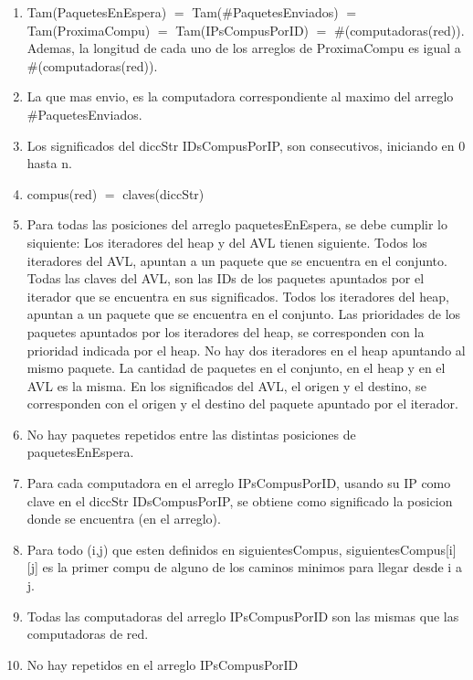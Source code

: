 \begin{Representacion}
    \begin{enumerate} 
      \item Tam(PaquetesEnEspera) $=$ Tam($\#$PaquetesEnviados) $=$ Tam(ProximaCompu) $=$ Tam(IPsCompusPorID) $=$ $\#$(computadoras(red)). Ademas, la longitud de cada uno de los arreglos de ProximaCompu es igual a \#(computadoras(red)).
      \item La que mas envio, es la computadora correspondiente al maximo del arreglo \#PaquetesEnviados.
      \item Los significados del diccStr IDsCompusPorIP, son consecutivos, iniciando en 0 hasta n.
      \item compus(red) $=$ claves(diccStr)
      \item Para todas las posiciones del arreglo paquetesEnEspera, se debe cumplir lo siquiente: 
              Los iteradores del heap y del AVL tienen siguiente.
              Todos los iteradores del AVL, apuntan a un paquete que se encuentra en el conjunto.
              Todas las claves del AVL, son las IDs de los paquetes apuntados por el iterador que se encuentra en sus significados.
              Todos los iteradores del heap, apuntan a un paquete que se encuentra en el conjunto.
              Las prioridades de los paquetes apuntados por los iteradores del heap, se corresponden con la prioridad indicada por el heap.
              No hay dos iteradores en el heap apuntando al mismo paquete.
              La cantidad de paquetes en el conjunto, en el heap y en el AVL es la misma.
              En los significados del AVL, el origen y el destino, se corresponden con el origen y el destino del paquete apuntado por el iterador.
      \item No hay paquetes repetidos entre las distintas posiciones de paquetesEnEspera.
      \item Para cada computadora en el arreglo IPsCompusPorID, usando su IP como clave en el diccStr IDsCompusPorIP, se obtiene como significado la posicion donde se encuentra (en el arreglo).
      \item Para todo (i,j) que esten definidos en siguientesCompus, siguientesCompus[i][j] es la primer compu de alguno de los caminos minimos para llegar desde i a j.
      \item Todas las computadoras del arreglo IPsCompusPorID son las mismas que las computadoras de red.
      \item No hay repetidos en el arreglo IPsCompusPorID


    \end{enumerate}




\end{Representacion}
